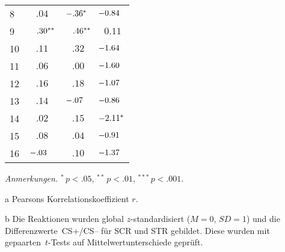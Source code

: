 \begin{table}[tb]
\begin{threeparttable}
\begin{tabularx}{\textwidth}{lCCC}
			8		&$.04$		&$\hspace*{-0.45em}-.36^{*}$ &$\hspace*{-0.85em}-0.84$		 \\
			9		&$\hspace*{+0.9em}.30^{**}$&$\hspace*{+0.9em}.46^{**}$&$0.11$		 \\
			10		&$.11$		&$.32$ 		&$\hspace*{-0.85em}-1.64$		 \\
			11		&$.06$		&$.00$ 		&$\hspace*{-0.85em}-1.60$		 \\
			12		&$.16$		&$.18$ 		&$\hspace*{-0.85em}-1.07$		 	\\
			13		&$.14$		&$\hspace*{-0.85em}-.07$ 	&$\hspace*{-0.85em}-0.86$		 \\
			14		&$.02$		&$.15$ 		&$\hspace*{-0.35em}-2.11^{*}$		 \\
			15		&$.08$		&$.04$ 		&$\hspace*{-0.85em}-0.91$		 \\
			16		&$\hspace*{-0.85em}-.03$&$.10$ 		&$\hspace*{-0.85em}-1.37$		 \\[-0.2em]\bottomrule
		\end{tabularx}
		\begin{tablenotes}
			\footnotesize{
				\item \textit{Anmerkungen.} ${}^{*}\, p<.05$, ${}^{**}\, p<.01$, ${}^{***}\, p<.001$. \item[a] Pearsons Korrelationskoeffizient $r$.	\item[b] Die Reaktionen wurden global $z$-standardisiert ($M=0$, $SD=1$) und die Differenzwerte~CS+/CS-- für SCR und STR gebildet. Diese wurden mit gepaarten~$t$-Tests auf Mittelwertunterschiede geprüft.}
		\end{tablenotes}
	\end{threeparttable}
	\end{table}	


